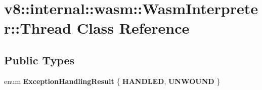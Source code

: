 \hypertarget{classv8_1_1internal_1_1wasm_1_1WasmInterpreter_1_1Thread}{}\section{v8\+:\+:internal\+:\+:wasm\+:\+:Wasm\+Interpreter\+:\+:Thread Class Reference}
\label{classv8_1_1internal_1_1wasm_1_1WasmInterpreter_1_1Thread}
\subsection*{Public Types}
\begin{DoxyCompactItemize}
\item 
\mbox{\label{classv8_1_1internal_1_1wasm_1_1WasmInterpreter_1_1Thread_ac180a02ba1edb4e660142eb31f063efd}} 
enum {\bfseries Exception\+Handling\+Result} \{ {\bfseries H\+A\+N\+D\+L\+ED}, 
{\bfseries U\+N\+W\+O\+U\+ND}
 \}
\end{DoxyCompactItemize}
